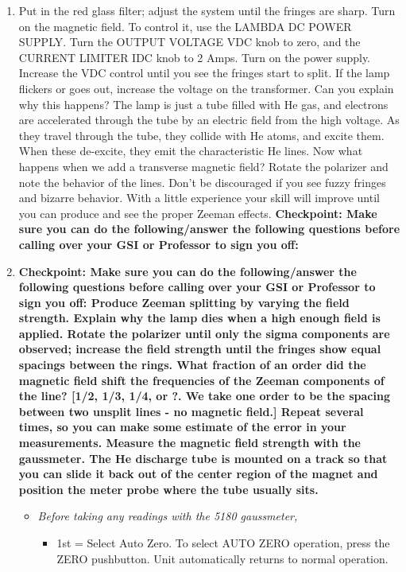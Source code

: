 \documentclass{../lab}
\begin{document}
\begin{enumerate}
    \item Put in the red glass filter; adjust the system until the fringes are sharp. Turn on the magnetic field. To control it, use the LAMBDA DC POWER SUPPLY. Turn the OUTPUT VOLTAGE VDC knob to zero, and the CURRENT LIMITER IDC knob to 2 Amps. Turn on the power supply. Increase the VDC control until you see the fringes start to split. If the lamp flickers or goes out, increase the voltage on the transformer. Can you explain why this happens? The lamp is just a tube filled with He gas, and electrons are accelerated through the tube by an electric field from the high voltage. As they travel through the tube, they collide with He atoms, and excite them. When these de-excite, they emit the characteristic He lines. Now what happens when we add a transverse magnetic field? Rotate the polarizer and note the behavior of the lines. Don't be discouraged if you see fuzzy fringes and bizarre behavior. With a little experience your skill will improve until you can produce and see the proper Zeeman effects.
    \textbf{Checkpoint: Make sure you can do the following/answer the following questions before calling over your GSI or Professor to sign you off:}

    \item \textbf{Checkpoint: Make sure you can do the following/answer the following questions before calling over your GSI or Professor to sign you off: Produce Zeeman splitting by varying the field strength. Explain why the lamp dies when a high enough field is applied. Rotate the polarizer until only the sigma components are observed; increase the field strength until the fringes show equal spacings between the rings. What fraction of an order did the magnetic field shift the frequencies of the Zeeman components of the line? [1/2, 1/3, 1/4, or ?. We take one order to be the spacing between two unsplit lines - no magnetic field.] Repeat several times, so you can make some estimate of the error in your measurements. Measure the magnetic field strength with the gaussmeter. The He discharge tube is mounted on a track so that you can slide it back out of the center region of the magnet and position the meter probe where the tube usually sits.}

    \begin{itemize}
        \item \emph{Before taking any readings with the 5180 gaussmeter,}
        \begin{itemize}
            \item 1st = Select Auto Zero. To select AUTO ZERO operation, press the ZERO pushbutton. Unit automatically returns to normal operation.
        

\end{itemize}
\end{itemize}
\end{enumerate}
\end{document}
